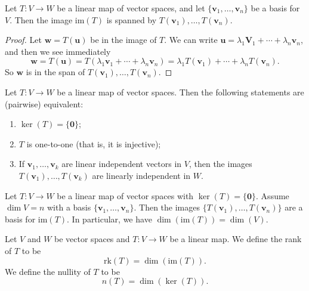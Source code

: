 \documentclass[10pt, a4paper]{article}
\newcommand{\mbf}[1]{\mathbf{#1}}
\begin{document}
\begin{lemma}
    Let $T : V \rightarrow W$ be a linear map of vector spaces,
    and let $\{\mbf{v}_1, \dotsc, \mbf{v}_n\}$ be a basis for $V$.
    Then the image $\mathrm{im}(T)$ is spanned by $T(\mbf{v}_1), \dotsc, T(\mbf{v}_n)$.
    \begin{proof}
        Let $\mbf{w} = T(\mbf{u})$ be in the image of $T$.
        We can write $\mbf{u} = \lambda_1\mbf{V}_1 + \dotsi + \lambda_n\mbf{v}_n$,
        and then we see immediately
        \[
        \mbf{w} = T(\mbf{u}) = T(\lambda_1\mbf{v}_1 + \dotsi + \lambda_n\mbf{v}_n) = \lambda_1T(\mbf{v}_1) + \dotsi + \lambda_nT(\mbf{v}_n).
        \]
        So $\mbf{w}$ is in the span of $T(\mbf{v}_1), \dotsc, T(\mbf{v}_n)$.
    \end{proof}
\end{lemma}

\begin{proposition}
    Let $T : V \rightarrow W$ be a linear map of vector spaces.
    Then the following statements are
    (pairwise)
    equivalent:
    \begin{enumerate}[label = (\roman*)]
        \item $\ker(T) = \{\mbf{0}\}$;
        \item $T$ is one-to-one
        (that is,
        it is injective);
        \item If $\mbf{v}_1, \dotsc, \mbf{v}_k$ are linear independent vectors in $V$,
        then the images $T(\mbf{v}_1), \dotsc, T(\mbf{v}_k)$ are linearly independent in $W$.
    \end{enumerate}
\end{proposition}

\begin{corollary}
    Let $T : V \rightarrow W$ be a linear map of vector spaces with $\ker(T) = \{\mbf{0}\}$.
    Assume $\dim{V} = n$ with a basis $\{\mbf{v}_1, \dotsc, \mbf{v}_n\}$.
    Then the images $\{T(\mbf{v}_1), \dotsc, T(\mbf{v}_n)\}$ are a basis for $\mathrm{im}(T)$.
    In particular,
    we have $\dim(\mathrm{im}(T)) = \dim(V)$.
\end{corollary}

\begin{definition}
    Let $V$ and $W$ be vector spaces and $T : V \rightarrow W$ be a linear map.
    We define the rank of $T$ to be
    \[
    \mathrm{rk}(T) = \dim(\mathrm{im}(T)).
    \]
    We define the nullity of $T$ to be
    \[
    n(T) = \dim(\ker(T)).
    \]
\end{definition}
\end{document}
